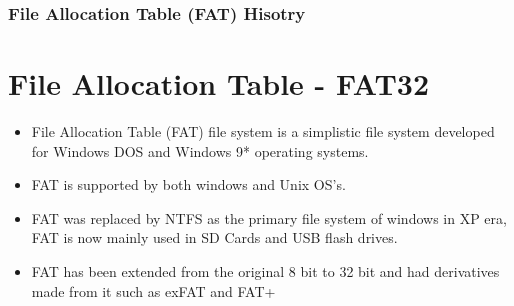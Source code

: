 \documentclass{beamer}
\begin{document}
\begin{frame}
	\frametitle{File Allocation Table (FAT) Hisotry}
	\section*{File Allocation Table - FAT32}
	\begin{itemize}
		\item File Allocation Table (FAT) file system is a simplistic file system developed for Windows DOS and Windows 9* operating systems. 
		\vspace{\baselineskip}
		\item FAT is supported by both windows and Unix OS's. 
		\vspace{\baselineskip}
		\item FAT was replaced by NTFS as the primary file system of windows in XP era, FAT is now mainly used in SD Cards and USB flash drives.
		\vspace{\baselineskip}
		\item FAT has been extended from the original 8 bit to 32 bit and had derivatives made from it such as exFAT and FAT+
	\end{itemize}	
\end{frame}
\end{document}
